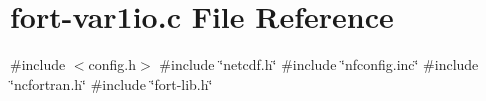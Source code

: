 \hypertarget{fort-var1io_8c}{}\section{fort-\/var1io.c File Reference}
\label{fort-var1io_8c}
{\ttfamily \#include $<$config.\+h$>$}\newline
{\ttfamily \#include \char`\"{}netcdf.\+h\char`\"{}}\newline
{\ttfamily \#include \char`\"{}nfconfig.\+inc\char`\"{}}\newline
{\ttfamily \#include \char`\"{}ncfortran.\+h\char`\"{}}\newline
{\ttfamily \#include \char`\"{}fort-\/lib.\+h\char`\"{}}\newline
